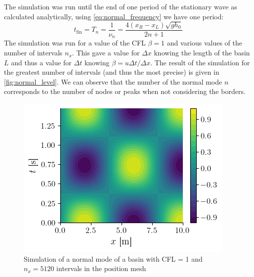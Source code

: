 The simulation was run until the end of one period of the stationary wave as calculated analytically, using \autoref{eq:normal_frequency} we have one period:
\begin{equation}
    t_\mathrm{fin} = T_n = \frac{1}{\nu_n} = \frac{4(x_R - x_L)\sqrt{gh_0}}{2n + 1}
\end{equation}
The simulation was run for a value of the CFL $\beta = 1$ and various values of the number of intervals $n_x$. This gave a value for $\Delta x$ knowing the length of the basin $L$ and thus a value for $\Delta t$ knowing $\beta = u\Delta t/\Delta x$. The result of the simulation for the greatest number of intervals (and thus the most precise) is given in \autoref{fig:normal_level}. We can observe that the number of the normal mode $n$ corresponds to the number of nodes or peaks when not considering the borders.
\begin{figure}[h]
    \centering
    \includegraphics[width=0.6\linewidth]{figures/bassin_mode_level.png}
    \caption{Simulation of a normal mode of a basin with CFL = 1 and $n_x = 5120$ intervals in the position mesh}
    \label{fig:normal_level}
\end{figure}

